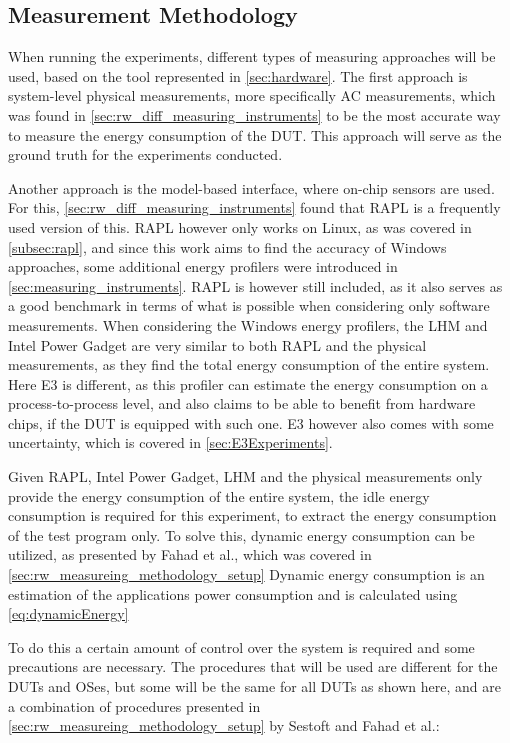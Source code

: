 \subsection{Measurement Methodology}

When running the experiments, different types of measuring approaches will be used, based on the tool represented in \cref{sec:hardware}. The first approach is system-level physical measurements, more specifically AC measurements, which was found in \cref{sec:rw_diff_measuring_instruments} to be the most accurate way to measure the energy consumption of the DUT. This approach will serve as the ground truth for the experiments conducted.

Another approach is the model-based interface, where on-chip sensors are used. For this, \cref{sec:rw_diff_measuring_instruments} found that RAPL is a frequently used version of this. RAPL however only works on Linux, as was covered in \cref{subsec:rapl}, and since this work aims to find the accuracy of Windows approaches, some additional energy profilers were introduced in \cref{sec:measuring_instruments}. RAPL is however still included, as it also serves as a good benchmark in terms of what is possible when considering only software measurements. When considering the Windows energy profilers, the LHM and Intel Power Gadget are very similar to both RAPL and the physical measurements, as they find the total energy consumption of the entire system. Here E3 is different, as this profiler can estimate the energy consumption on a process-to-process level, and also claims to be able to benefit from hardware chips, if the DUT is equipped with such one.\cite*{E3WinHec} E3 however also comes with some uncertainty, which is covered in \cref{sec:E3Experiments}.

Given RAPL, Intel Power Gadget, LHM and the physical measurements only provide the energy consumption of the entire system, the idle energy consumption is required for this experiment, to extract the energy consumption of the test program only. To solve this, dynamic energy consumption can be utilized, as presented by Fahad et al.\cite{fahad2019comparative}, which was covered in \cref{sec:rw_measureing_methodology_setup} Dynamic energy consumption is an estimation of the applications power consumption and is calculated using \cref{eq:dynamicEnergy}

To do this a certain amount of control over the system is required and some precautions are necessary. The procedures that will be used are different for the DUTs and OSes, but some will be the same for all DUTs as shown here, and are a combination of procedures presented in \cref{sec:rw_measureing_methodology_setup} by Sestoft\cite*[]{sestoft2013microbenchmarks} and Fahad et al.\cite*[]{fahad2019comparative}:

